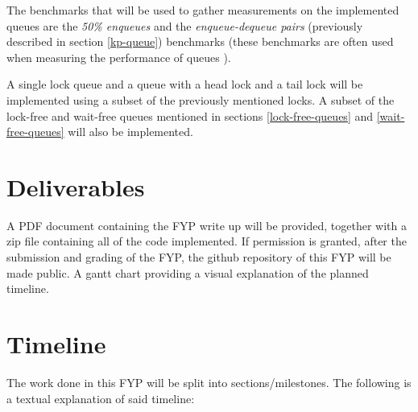 \documentclass[a4paper, 12pt, titlepage]{article}
\begin{document}
\begin{singlespace}
The benchmarks that will be used to gather measurements on the implemented queues are the \emph{50\% enqueues} and the \emph{enqueue-dequeue pairs} (previously described in section \ref{kp-queue}) benchmarks (these benchmarks are often used when measuring the performance of queues \cite{kogan2011wait,hoffman2007baskets,ladan2004optimistic}).

A single lock queue and a queue with a head lock and a tail lock will be implemented using a subset of the previously mentioned locks. A subset of the lock-free and wait-free queues mentioned in sections \ref{lock-free-queues} and \ref{wait-free-queues} will also be implemented.

\section{Deliverables}
A PDF document containing the FYP write up will be provided, together with a zip file containing all of the code implemented. If permission is granted, after the submission and grading of the FYP, the github repository of this FYP will be made public. A gantt chart providing a visual explanation of the planned timeline.

\section{Timeline}
The work done in this FYP will be split into sections/milestones. The following is a textual explanation of said timeline:


\end{singlespace}
\end{document}

